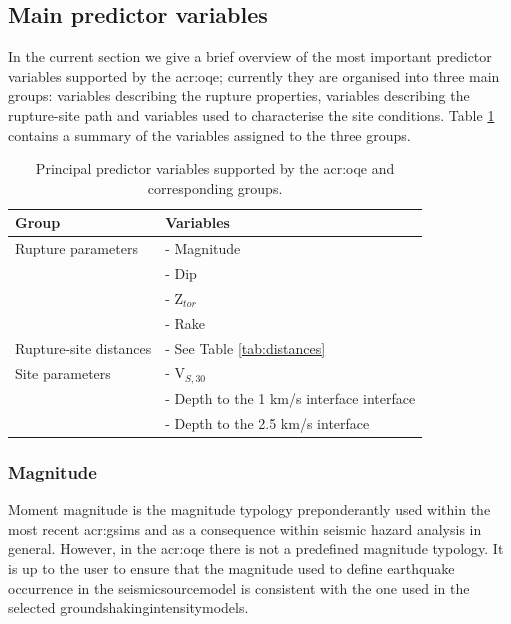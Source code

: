 \subsection{Main predictor variables}
In the current section we give a brief overview of the most important predictor 
variables \parencite[for a summary, see][]{akkar2013r} supported by the 
\gls{acr:oqe}; currently they are organised into three main groups: variables 
describing the rupture properties, variables describing the rupture\--site 
path and variables used to characterise the site conditions. 
%
Table \ref{tab:parameters} contains a summary of the variables
assigned to the three groups.
\begin{table}[!h]
\centering
\begin{tabular}{|p{5cm}p{8cm}|}
\hline
\rowcolor{anti-flashwhite}
\bf{Group} & \bf{Variables} \\
\hline 
Rupture parameters & - Magnitude\\
                   & - Dip \\ 
                   & - Z$_{tor}$ \\ 
                   & - Rake \\ \hline
Rupture-site distances & - See Table \ref{tab:distances} \\ \hline
Site parameters & - V$_{S,30}$ \\
                & - Depth to the 1 km/s interface interface \\
                & - Depth to the 2.5 km/s interface \\ 
\hline
\end{tabular}
\caption{Principal predictor variables supported by the \gls{acr:oqe} and 
    corresponding groups.}
\label{tab:parameters}
\end{table}
%
\subsubsection{Magnitude}
Moment magnitude \parencite{hanks1979} is the magnitude typology 
preponderantly used within the most recent \glspl{acr:gsim} and as a 
consequence within seismic hazard analysis in general. 
%
However, in the \gls{acr:oqe} there is not a predefined magnitude typology.
It is up to the user to ensure that the magnitude used to define earthquake 
occurrence in the \gls{seismicsourcemodel} is consistent with the one used 
in the selected \glspl{groundshakingintensitymodel}.

